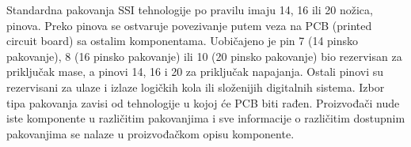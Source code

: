 \begin{frame}[label=03-s003]
Standardna pakovanja SSI tehnologije po pravilu imaju 14, 16 ili 20 nožica, pinova. Preko pinova se ostvaruje povezivanje putem veza na PCB (printed circuit board) sa ostalim komponentama. Uobičajeno je pin 7 (14 pinsko pakovanje), 8 (16 pinsko pakovanje) ili 10 (20 pinsko pakovanje) bio rezervisan za priključak mase, a pinovi 14, 16 i 20 za priključak napajanja. Ostali pinovi su rezervisani za ulaze i izlaze logičkih kola ili složenijih digitalnih sistema. Izbor tipa pakovanja zavisi od tehnologije u kojoj će PCB biti rađen. Proizvođači nude iste komponente u različitim pakovanjima i sve informacije o različitim dostupnim pakovanjima se nalaze u proizvođačkom opisu komponente.
\end{frame}
